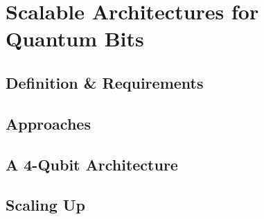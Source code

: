 \chapter{Scalable Architectures for Quantum Bits}

\section{Definition \& Requirements}

\section{Approaches}

\section{A 4-Qubit Architecture}

\section{Scaling Up}

